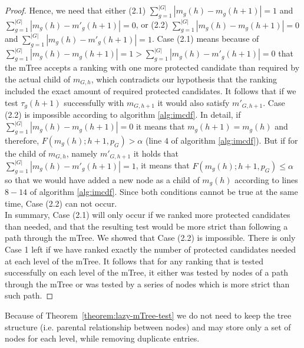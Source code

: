 \begin{proof}
	Hence, we need that either
	(2.1) $\sum_{g=1}^{|G|} |m_{g}(h) - m_g(h+1)| = 1$ and $\sum_{g=1}^{|G|} |m_{g}(h) - m'_g(h+1)| = 0$,
	or
	(2.2) $\sum_{g=1}^{|G|} |m_{g}(h) - m_g(h+1)| = 0$ and $\sum_{g=1}^{|G|} |m_{g}(h) - m'_g(h+1)| = 1$.
	Case (2.1) means because of $\sum_{g=1}^{|G|} |m_{g}(h) - m_g(h+1)| = 1 > \sum_{g=1}^{|G|} |m_{g}(h) - m'_g(h+1)| = 0$ that the mTree accepts a ranking with one more protected candidate than required by the actual child of $m_{G,h}$, which contradicts our hypothesis that the ranking included the exact amount of required protected candidates. It follows that if we test $\tau_g (h+1)$ successfully with $m_{G,h+1}$ it would also satisfy ${m'}_{G,h+1}$.
Case (2.2) is impossible according to algorithm \ref{alg:imcdf}.
In detail, if $\sum_{g=1}^{|G|} |m_{g}(h) - m_g(h+1)| = 0$ it means that $ m_g(h+1) = m_{g}(h)$ and therefore, $F(m_{g}(h);h+1,p_G) > \alpha$ (line $4$ of algorithm \ref{alg:imcdf}). But if for the child of $m_{G,h}$, namely ${m'}_{G,h+1}$ it holds that $\sum_{g=1}^{|G|} |m_{g}(h) - m'_g(h+1)| = 1$, it means that
$F(m_{g}(h);h+1,p_G) \leq \alpha$ so that we would have added a new node as a child of $m_{g}(h)$ according to lines  $8-14$ of algorithm \ref{alg:imcdf}. Since both conditions cannot be true at the same time, Case (2.2) can not occur.
\\
In summary, Case (2.1) will only occur if we ranked more protected candidates than needed, and that the resulting test would be more strict than following a path through the mTree.
%
We showed that Case (2.2) is impossible. There is only Case 1 left if we have ranked exactly the number of protected candidates needed at each level of the mTree.
%
It follows that for any ranking that is tested successfully on each level of the mTree, it either was tested by nodes of a path through the mTree or was tested by a series of nodes which is more strict than such path.
\end{proof}
%
\noindent Because of Theorem~\ref{theorem:lazy-mTree-test} we do not need to keep the tree structure (i.e. parental relationship between nodes) and may store only a set of nodes for each level, while removing duplicate entries.

